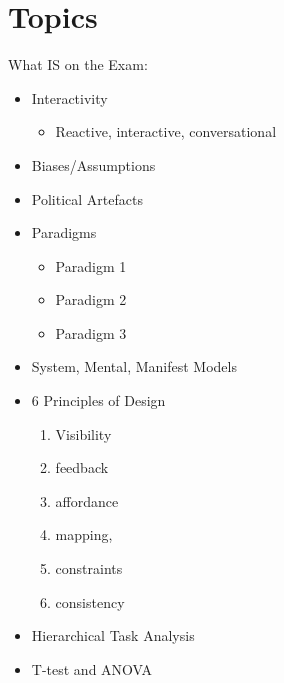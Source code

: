 \documentclass{article}
\begin{document}
\section*{Topics}
What IS on the Exam:
\begin{itemize}
\item Interactivity 
\begin{itemize}
    \item Reactive, interactive, conversational
\end{itemize}

\end{itemize}
\begin{itemize}
\item Biases/Assumptions


\end{itemize}
\begin{itemize}
\item Political Artefacts 

\end{itemize}


\begin{itemize}
\item Paradigms 
\begin{itemize}
    \item Paradigm 1
    \item Paradigm 2
    \item Paradigm 3
\end{itemize}
\end{itemize}
\begin{itemize}
\item System, Mental, Manifest Models 
\end{itemize}
\begin{itemize}
\item 6 Principles of Design
\begin{enumerate}
    \item Visibility 
    \item feedback 
    \item affordance
    \item mapping, 
    \item constraints
    \item  consistency
    \end{enumerate}
\end{itemize}

\begin{itemize}
    \item Hierarchical Task Analysis 
\end{itemize}
\begin{itemize}
    \item T-test and ANOVA
\end{itemize}
\end{document}
